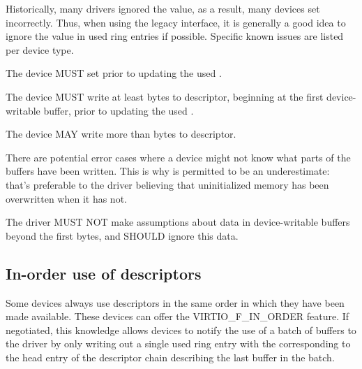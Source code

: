 Historically, many drivers ignored the  value, as a
result, many devices set  incorrectly.  Thus, when
using the legacy interface, it is generally a good idea to ignore
the  value in used ring entries if possible.  Specific
known issues are listed per device type.


The device MUST set  prior to updating the used .

The device MUST write at least  bytes to descriptor,
beginning at the first device-writable buffer,
prior to updating the used .

The device MAY write more than  bytes to descriptor.

\begin{note}
There are potential error cases where a device might not know what
parts of the buffers have been written.  This is why  is
permitted to be an underestimate: that's preferable to the driver believing
that uninitialized memory has been overwritten when it has not.
\end{note}


The driver MUST NOT make assumptions about data in device-writable buffers
beyond the first  bytes, and SHOULD ignore this data.

\subsection{In-order use of descriptors}
\label{sec:Basic Facilities of a Virtio Device / Virtqueues / In-order use of descriptors}

Some devices always use descriptors in the same order in which
they have been made available. These devices can offer the
VIRTIO_F_IN_ORDER feature. If negotiated, this knowledge allows
devices to notify the use of a batch of buffers to the driver by
only writing out a single used ring entry with the 
corresponding to the head entry of the
descriptor chain describing the last buffer in the batch.

